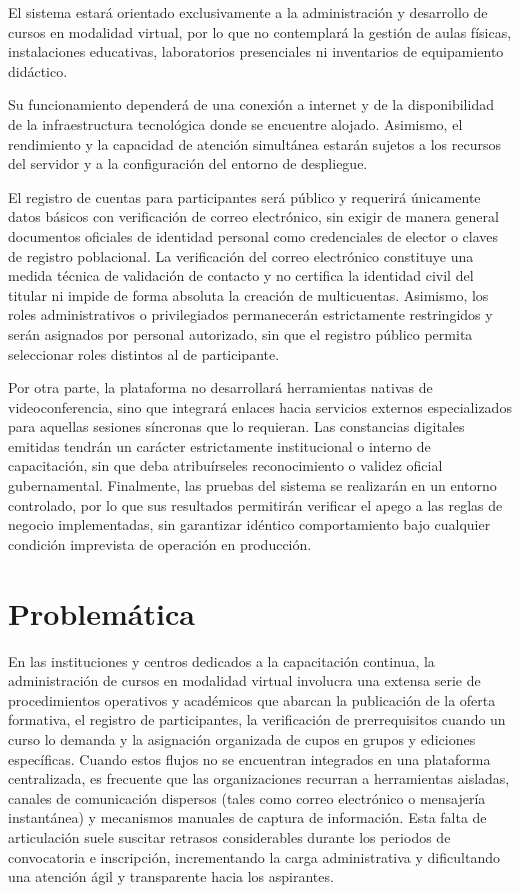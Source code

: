 El sistema estará orientado exclusivamente a la administración y desarrollo de cursos en modalidad virtual, por lo que no contemplará la gestión de aulas físicas, instalaciones educativas, laboratorios presenciales ni inventarios de equipamiento didáctico.

Su funcionamiento dependerá de una conexión a internet y de la disponibilidad de la infraestructura tecnológica donde se encuentre alojado. Asimismo, el rendimiento y la capacidad de atención simultánea estarán sujetos a los recursos del servidor y a la configuración del entorno de despliegue.

El registro de cuentas para participantes será público y requerirá únicamente datos básicos con verificación de correo electrónico, sin exigir de manera general documentos oficiales de identidad personal como credenciales de elector o claves de registro poblacional. La verificación del correo electrónico constituye una medida técnica de validación de contacto y no certifica la identidad civil del titular ni impide de forma absoluta la creación de multicuentas. Asimismo, los roles administrativos o privilegiados permanecerán estrictamente restringidos y serán asignados por personal autorizado, sin que el registro público permita seleccionar roles distintos al de participante.

Por otra parte, la plataforma no desarrollará herramientas nativas de videoconferencia, sino que integrará enlaces hacia servicios externos especializados para aquellas sesiones síncronas que lo requieran. Las constancias digitales emitidas tendrán un carácter estrictamente institucional o interno de capacitación, sin que deba atribuírseles reconocimiento o validez oficial gubernamental. Finalmente, las pruebas del sistema se realizarán en un entorno controlado, por lo que sus resultados permitirán verificar el apego a las reglas de negocio implementadas, sin garantizar idéntico comportamiento bajo cualquier condición imprevista de operación en producción.

\section{Problemática}

En las instituciones y centros dedicados a la capacitación continua, la administración de cursos en modalidad virtual involucra una extensa serie de procedimientos operativos y académicos que abarcan la publicación de la oferta formativa, el registro de participantes, la verificación de prerrequisitos cuando un curso lo demanda y la asignación organizada de cupos en grupos y ediciones específicas. Cuando estos flujos no se encuentran integrados en una plataforma centralizada, es frecuente que las organizaciones recurran a herramientas aisladas, canales de comunicación dispersos (tales como correo electrónico o mensajería instantánea) y mecanismos manuales de captura de información. Esta falta de articulación suele suscitar retrasos considerables durante los periodos de convocatoria e inscripción, incrementando la carga administrativa y dificultando una atención ágil y transparente hacia los aspirantes.

